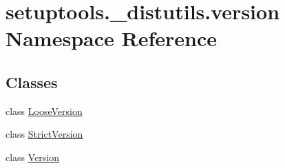 \hypertarget{namespacesetuptools_1_1__distutils_1_1version}{}\section{setuptools.\+\_\+distutils.\+version Namespace Reference}
\label{namespacesetuptools_1_1__distutils_1_1version}
\subsection*{Classes}
\begin{DoxyCompactItemize}
\item 
class \hyperlink{classsetuptools_1_1__distutils_1_1version_1_1LooseVersion}{Loose\+Version}
\item 
class \hyperlink{classsetuptools_1_1__distutils_1_1version_1_1StrictVersion}{Strict\+Version}
\item 
class \hyperlink{classsetuptools_1_1__distutils_1_1version_1_1Version}{Version}
\end{DoxyCompactItemize}
